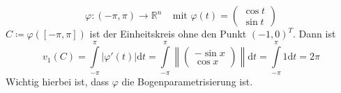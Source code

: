 \begin{beispiel}
\begin{equation*}
	\varphi:\left(-\pi,\pi\right)\rightarrow\mathbb{R}^n 
	\ \ \ \ \ \text{mit\ } \varphi(t)=\begin{pmatrix}
	\cos t \\ \sin t
	\end{pmatrix}
\end{equation*}
$C\coloneqq \varphi([-\pi,\pi])$ ist der Einheitskreis ohne den Punkt $(-1,0)^T$. 
Dann ist 
\begin{equation*}
	v_1(C)=\int\limits_{-\pi}^{\pi}|\varphi'(t)|\mathrm{d}t=\int\limits_{-\pi}^{\pi}\left\|\begin{pmatrix}
	-\sin x \\ \cos x
	\end{pmatrix}\right\|\mathrm{d}t = 
	\int\limits_{-\pi}^{\pi}1\mathrm{d}t=2\pi
\end{equation*}
Wichtig hierbei ist, dass $\varphi$ die Bogenparametrisierung ist.
\end{beispiel}